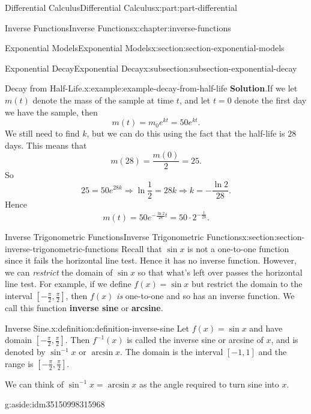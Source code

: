 \documentclass[twoside,10pt,]{book}
\newcommand{\blocktitlefont}{\relax}
\newcommand{\terminology}[1]{\textbf{#1}}
\numberwithin{equation}{part}
\begin{document}
\begin{partptx}{Differential Calculus}{}{Differential Calculus}{}{}{x:part:part-differential}
\begin{chapterptx}{Inverse Functions}{}{Inverse Functions}{}{}{x:chapter:inverse-functions}
\begin{sectionptx}{Exponential Models}{}{Exponential Models}{}{}{x:section:section-exponential-models}
\begin{subsectionptx}{Exponential Decay}{}{Exponential Decay}{}{}{x:subsection:subsection-exponential-decay}
\begin{example}{Decay from Half-Life.}{x:example:example-decay-from-half-life}
\noindent\textbf{\blocktitlefont Solution}.\hypertarget{g:solution:idm35150998330048}{}\quad{}If we let \(m(t)\) denote the mass of the sample at time \(t\), and let \(t=0\) denote the first day we have the sample, then%
\begin{equation*}
m(t) = m_{0}e^{kt} = 50e^{kt}.
\end{equation*}
We still need to find \(k\), but we can do this using the fact that the half-life is \(28\) days. This means that%
\begin{equation*}
m(28) = \frac{m(0)}{2} = 25.
\end{equation*}
So%
\begin{equation*}
25 = 50e^{28k}\Rightarrow \ln\frac{1}{2} = 28k\Rightarrow k = -\frac{\ln2}{28}.
\end{equation*}
Hence%
\begin{equation*}
m(t) = 50e^{-\frac{\ln2}{28}t} = 50\cdot2^{-\frac{t}{28}}.
\end{equation*}
%
\end{example}
\end{subsectionptx}
\end{sectionptx}
%
%
\typeout{************************************************}
\typeout{************************************************}
%
\begin{sectionptx}{Inverse Trigonometric Functions}{}{Inverse Trigonometric Functions}{}{}{x:section:section-inverse-trigonometric-functions}
Recall that \(\sin x\) is not a one-to-one function since it fails the horizontal line test. Hence it has no inverse function. However, we can \emph{restrict} the domain of \(\sin x\) so that what's left over passes the horizontal line test. For example, if we define \(f(x) = \sin x\) but restrict the domain to the interval \([-\frac{\pi}{2},\frac{\pi}{2}]\), then \(f(x)\) \emph{is} one-to-one and so has an inverse function. We call this function \terminology{inverse sine} or \terminology{arcsine}.%
\begin{definition}{Inverse Sine.}{x:definition:definition-inverse-sine}%
%
Let \(f(x) = \sin x\) and have domain \([-\frac{\pi}{2},\frac{\pi}{2}]\). Then \(f^{-1}(x)\) is called the inverse sine or arcsine of \(x\), and is denoted by \(\sin^{-1}x\) or \(\arcsin x\). The domain is the interval \([-1,1]\) and the range is \([-\frac{\pi}{2},\frac{\pi}{2}]\).%
\end{definition}
We can think of \(\sin^{-1}x = \arcsin x\) as the angle required to turn sine into \(x\). \begin{aside}{}{g:aside:idm35150998315968}%

\end{aside}
\end{sectionptx}
\end{chapterptx}
\end{partptx}
\end{document}
